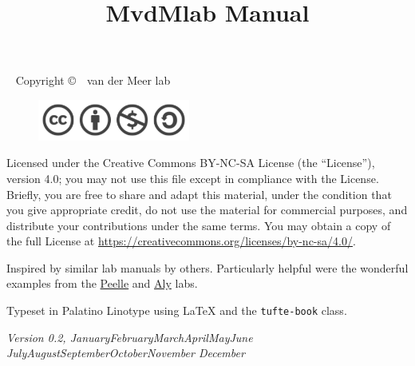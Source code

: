 \documentclass{tufte-book}
\title{MvdMlab Manual}
\newcommand{\monthyear}{%
  \ifcase\month\or January\or February\or March\or April\or May\or June\or
  July\or August\or September\or October\or November\or
  December\fi\space\number\year
}
\newcommand{\openepigraph}[2]{%
  \begin{fullwidth}
  \sffamily\large
  \begin{doublespace}
  \noindent\allcaps{#1}\\%
  \noindent\allcaps{#2}%
  \end{doublespace}
  \end{fullwidth}
}
\newcommand{\blankpage}{\newpage\hbox{}\thispagestyle{empty}\newpage}
\newcommand{\doccls}[1]{\texttt{#1}}%
\begin{document}



\maketitle

\newpage
\begin{fullwidth}
~\vfill
\thispagestyle{empty}
\setlength{\parindent}{0pt}
\setlength{\parskip}{\baselineskip}
Copyright \copyright\ \the\year\ van der Meer lab

\par{}

\begin{figure}
  \includegraphics[width=5cm]{images/license.png}
\end{figure}


\par Licensed under the Creative Commons BY-NC-SA License (the
``License''), version 4.0; you may not use this file except in
compliance with the License. Briefly, you are free to share and adapt
this material, under the condition that you give appropriate credit,
do not use the material for commercial purposes, and distribute your
contributions under the same terms. You may obtain a copy of the full
License at \url{https://creativecommons.org/licenses/by-nc-sa/4.0/}.

\par Inspired by similar lab manuals by others. Particularly helpful
were the wonderful examples from the
\href{http://jpeelle.net/peellelab_manual.pdf}{Peelle} and \href{https://github.com/alylab/labmanual}{Aly} labs.

\par Typeset in Palatino Linotype using \LaTeX{} and the
\doccls{tufte-book} class.

\par\textit{Version 0.2, \monthyear}
\end{fullwidth}
\end{document}

